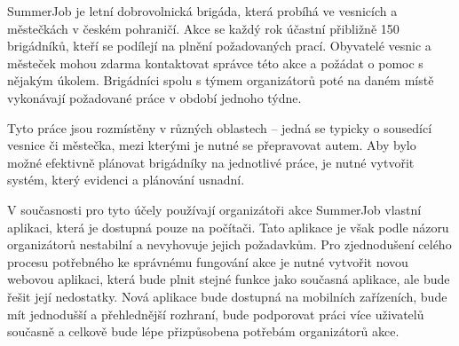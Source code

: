 \begin{introduction}
	SummerJob je letní dobrovolnická brigáda, která probíhá
ve vesnicích a městečkách v českém pohraničí. Akce se každý rok účastní přibližně 150 brigádníků, kteří se podílejí na plnění požadovaných prací.
Obyvatelé vesnic a městeček mohou zdarma kontaktovat správce této akce a požádat o pomoc s nějakým úkolem.
Brigádníci spolu s týmem organizátorů poté na daném místě vykonávají požadované práce v období jednoho týdne.

Tyto práce jsou rozmístěny v různých oblastech -- jedná se typicky o sousedící vesnice či městečka, mezi kterými je nutné se přepravovat autem.
Aby bylo možné efektivně plánovat brigádníky na jednotlivé práce, je nutné vytvořit systém, který evidenci a plánování usnadní.

V současnosti pro tyto účely používají organizátoři akce SummerJob vlastní aplikaci, která je dostupná pouze na počítači. Tato aplikace je však podle
názoru organizátorů nestabilní a nevyhovuje jejich požadavkům. Pro zjednodušení celého procesu potřebného ke správnému fungování akce je nutné vytvořit novou webovou aplikaci,
která bude plnit stejné funkce jako
současná aplikace, ale bude řešit její nedostatky. Nová aplikace bude dostupná na mobilních zařízeních, bude mít jednodušší a přehlednější rozhraní, bude
podporovat práci více uživatelů současně a celkově bude lépe přizpůsobena potřebám organizátorů akce.
\end{introduction}